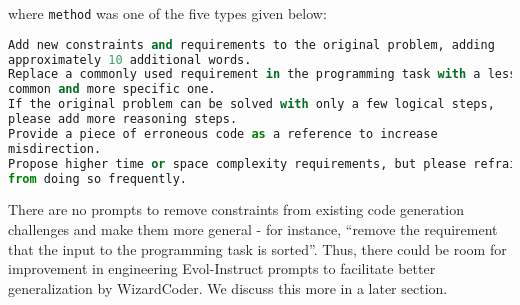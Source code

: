 \documentclass[10pt]{article}
\newcommand{\code}[1]{\texttt{#1}}
\theoremstyle{definition}
\begin{document}
\noindent where \code{method} was one of the five types given below:
\begin{lstlisting}[language=Python]
Add new constraints and requirements to the original problem, adding
approximately 10 additional words.
Replace a commonly used requirement in the programming task with a less
common and more specific one.
If the original problem can be solved with only a few logical steps,
please add more reasoning steps.
Provide a piece of erroneous code as a reference to increase
misdirection.
Propose higher time or space complexity requirements, but please refrain
from doing so frequently.
\end{lstlisting}

\noindent There are no prompts to remove constraints from existing code generation challenges and make them more general - for instance, ``remove the requirement that the input to the programming task is sorted''. Thus, there could be room for improvement in engineering Evol-Instruct prompts to facilitate better generalization by WizardCoder. We discuss this more in a later section.\\
\end{document}
